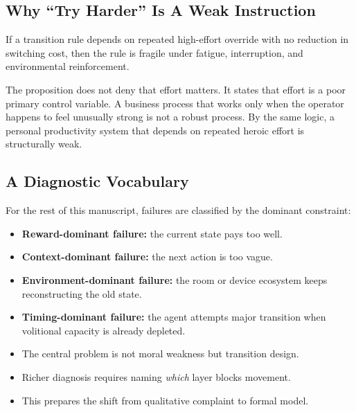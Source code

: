 \subsection{Why ``Try Harder'' Is A Weak Instruction}

\begin{proposition}
If a transition rule depends on repeated high-effort override with no reduction
in switching cost, then the rule is fragile under fatigue, interruption, and
environmental reinforcement.
\end{proposition}

\begin{discussion}
The proposition does not deny that effort matters. It states that effort is a
poor primary control variable. A business process that works only when the
operator happens to feel unusually strong is not a robust process. By the same
logic, a personal productivity system that depends on repeated heroic effort is
structurally weak.
\end{discussion}

\subsection{A Diagnostic Vocabulary}

For the rest of this manuscript, failures are classified by the dominant
constraint:
\begin{itemize}
  \item \textbf{Reward-dominant failure:} the current state pays too well.
  \item \textbf{Context-dominant failure:} the next action is too vague.
  \item \textbf{Environment-dominant failure:} the room or device ecosystem
        keeps reconstructing the old state.
  \item \textbf{Timing-dominant failure:} the agent attempts major transition
        when volitional capacity is already depleted.
\end{itemize}

\begin{summarybox}
\begin{itemize}
  \item The central problem is not moral weakness but transition design.
  \item Richer diagnosis requires naming \emph{which} layer blocks movement.
  \item This prepares the shift from qualitative complaint to formal model.
\end{itemize}
\end{summarybox}

